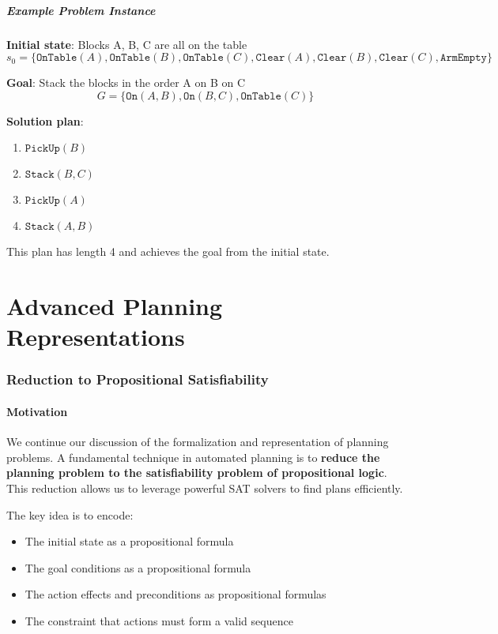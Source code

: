 \documentclass[11pt,a4paper]{article}
\theoremstyle{definition}
\theoremstyle{plain}
\theoremstyle{remark}
\begin{document}
\subsubsection{Example Problem Instance}

\textbf{Initial state}: Blocks A, B, C are all on the table
\[
s_0 = \{\texttt{OnTable}(A), \texttt{OnTable}(B), \texttt{OnTable}(C), \texttt{Clear}(A), \texttt{Clear}(B), \texttt{Clear}(C), \texttt{ArmEmpty}\}
\]

\textbf{Goal}: Stack the blocks in the order A on B on C
\[
G = \{\texttt{On}(A, B), \texttt{On}(B, C), \texttt{OnTable}(C)\}
\]

\textbf{Solution plan}:
\begin{enumerate}
    \item $\texttt{PickUp}(B)$
    \item $\texttt{Stack}(B, C)$
    \item $\texttt{PickUp}(A)$
    \item $\texttt{Stack}(A, B)$
\end{enumerate}

This plan has length 4 and achieves the goal from the initial state.


\newpage

\part{Advanced Planning Representations}

\section{Reduction to Propositional Satisfiability}

\subsection{Motivation}

We continue our discussion of the formalization and representation of planning problems. A fundamental technique in automated planning is to \textbf{reduce the planning problem to the satisfiability problem of propositional logic}. This reduction allows us to leverage powerful SAT solvers to find plans efficiently.

The key idea is to encode:
\begin{itemize}
    \item The initial state as a propositional formula
    \item The goal conditions as a propositional formula
    \item The action effects and preconditions as propositional formulas
    \item The constraint that actions must form a valid sequence
\end{itemize}
\end{document}
